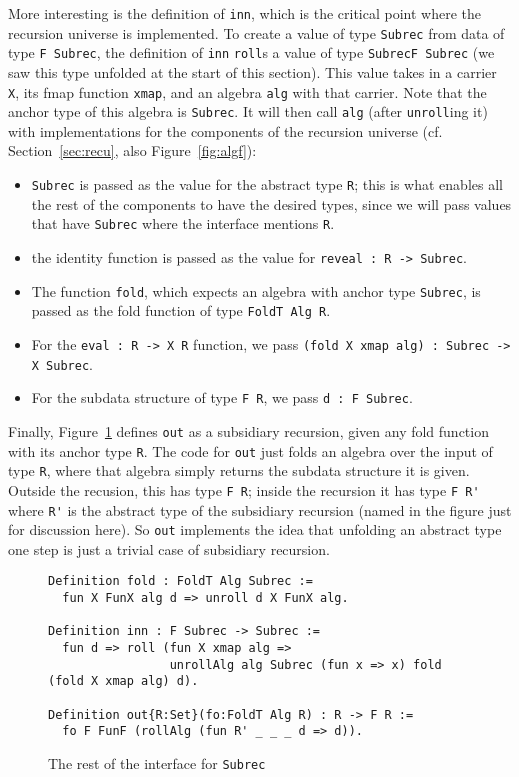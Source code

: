\documentclass[a4paper,USenglish]{lipics-v2021}
\begin{document}
More interesting is the definition of \verb|inn|, which is the
critical point where the recursion universe is implemented.  To create
a value of type \verb|Subrec| from data of type \verb|F Subrec|, the
definition of \verb|inn| \verb|roll|s a value of type
\verb|SubrecF Subrec| (we saw this type unfolded at the start of
this section).  This value takes in a carrier
\verb|X|, its fmap function \verb|xmap|, and an algebra \verb|alg|
with that carrier.  Note that the anchor type of this algebra is
\verb|Subrec|.  It will then call \verb|alg| (after \verb|unroll|ing
it) with implementations for the components of the recursion universe
(cf. Section~\ref{sec:recu}, also Figure~\ref{fig:algf}):
\begin{itemize}
\item \verb|Subrec| is passed as the value for the abstract type \verb|R|; this is what enables all
  the rest of the components to have the desired types, since we will pass values that have \verb|Subrec|
  where the interface mentions \verb|R|.
\item the identity function is passed as the value for \verb|reveal : R -> Subrec|.
\item The function \verb|fold|, which expects an algebra with anchor type \verb|Subrec|, is passed as
  the fold function of type \verb|FoldT Alg R|. 
\item For the \verb|eval : R -> X R| function, we pass \verb|(fold X xmap alg) : Subrec -> X Subrec|.
\item For the subdata structure of type \verb|F R|, we pass \verb|d : F Subrec|. 
\end{itemize}

Finally, Figure~\ref{fig:subrecb} defines \verb|out| as a subsidiary
recursion, given any fold function with its anchor type \verb|R|.  The
code for \verb|out| just folds an algebra over the input of type
\verb|R|, where that algebra simply returns the subdata structure it
is given.  Outside the recusion, this has type \verb|F R|; inside the
recursion it has type \verb|F R'| where \verb|R'| is the abstract type
of the subsidiary recursion (named in the figure just for discussion
here).  So \verb|out| implements the idea that unfolding an abstract
type one step is just a trivial case of subsidiary recursion.

\begin{figure}
\begin{verbatim}
Definition fold : FoldT Alg Subrec := 
  fun X FunX alg d => unroll d X FunX alg.

Definition inn : F Subrec -> Subrec :=
  fun d => roll (fun X xmap alg =>
                 unrollAlg alg Subrec (fun x => x) fold (fold X xmap alg) d).

Definition out{R:Set}(fo:FoldT Alg R) : R -> F R :=
  fo F FunF (rollAlg (fun R' _ _ _ d => d)).
\end{verbatim}
\caption{The rest of the interface for \texttt{Subrec}}
\label{fig:subrecb}
\end{figure}
\end{document}
